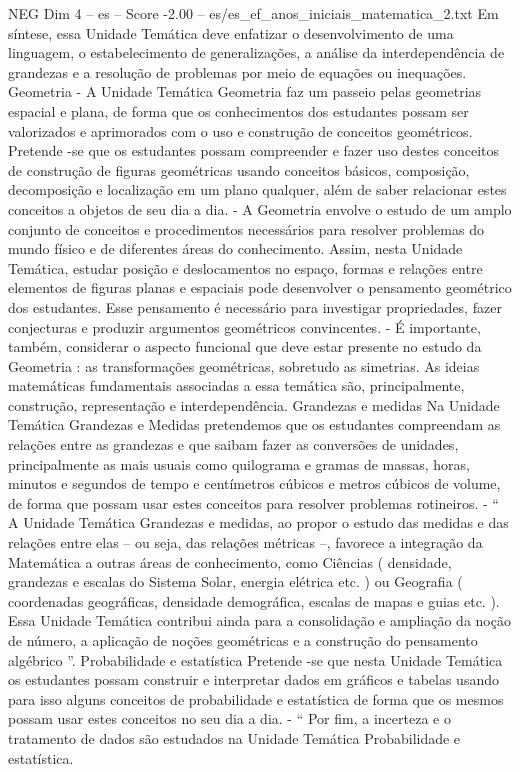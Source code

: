 \begin{textsample}{NEG Dim 4 – es – Score -2.00 – es/es\_ef\_anos\_iniciais\_matematica\_2.txt}
Em síntese, essa Unidade Temática deve enfatizar o desenvolvimento de uma linguagem, o estabelecimento de generalizações, a análise da interdependência de grandezas e a resolução de problemas por meio de equações ou inequações.
Geometria - A Unidade Temática Geometria faz um passeio pelas geometrias espacial e plana, de forma que os conhecimentos dos estudantes possam ser valorizados e aprimorados com o uso e construção de conceitos geométricos.
Pretende -se que os estudantes possam compreender e fazer uso destes conceitos de construção de figuras geométricas usando conceitos básicos, composição, decomposição e localização em um plano qualquer, além de saber relacionar estes conceitos a objetos de seu dia a dia. - A Geometria envolve o estudo de um amplo conjunto de conceitos e procedimentos necessários para resolver problemas do mundo físico e de diferentes áreas do conhecimento.
Assim, nesta Unidade Temática, estudar posição e deslocamentos no espaço, formas e relações entre elementos de figuras planas e espaciais pode desenvolver o pensamento geométrico dos estudantes.
Esse pensamento é necessário para investigar propriedades, fazer conjecturas e produzir argumentos geométricos convincentes. - É importante, também, considerar o aspecto funcional que deve estar presente no estudo da Geometria : as transformações geométricas, sobretudo as simetrias.
As ideias matemáticas fundamentais associadas a essa temática são, principalmente, construção, representação e interdependência.
Grandezas e medidas Na Unidade Temática Grandezas e Medidas pretendemos que os estudantes compreendam as relações entre as grandezas e que saibam fazer as conversões de unidades, principalmente as mais usuais como quilograma e gramas de massas, horas, minutos e segundos de tempo e centímetros cúbicos e metros cúbicos de volume, de forma que possam usar estes conceitos para resolver problemas rotineiros. - “ A Unidade Temática Grandezas e medidas, ao propor o estudo das medidas e das relações entre elas – ou seja, das relações métricas –, favorece a integração da Matemática a outras áreas de conhecimento, como Ciências ( densidade, grandezas e escalas do Sistema Solar, energia elétrica etc. ) ou Geografia ( coordenadas geográficas, densidade demográfica, escalas de mapas e guias etc. ).
Essa Unidade Temática contribui ainda para a consolidação e ampliação da noção de número, a aplicação de noções geométricas e a construção do pensamento algébrico ”.
Probabilidade e estatística Pretende -se que nesta Unidade Temática os estudantes possam construir e interpretar dados em gráficos e tabelas usando para isso alguns conceitos de probabilidade e estatística de forma que os mesmos possam usar estes conceitos no seu dia a dia. - “ Por fim, a incerteza e o tratamento de dados são estudados na Unidade Temática Probabilidade e estatística.

\end{textsample}
